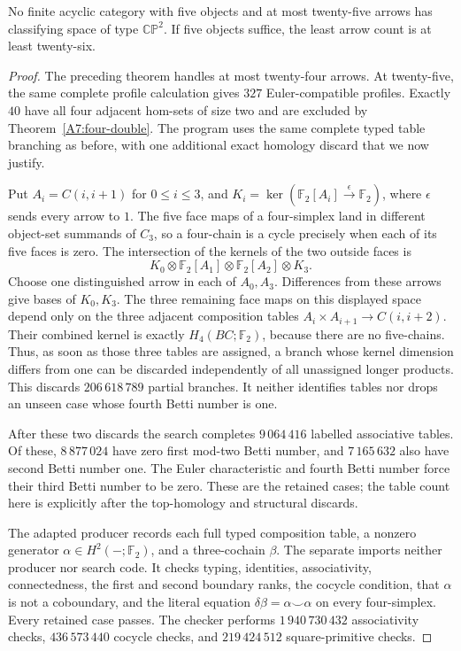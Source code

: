 \begin{theorem}\label{A7:through25}
No finite acyclic category with five objects and at most twenty-five
arrows has classifying space of type $\mathbb{CP}^2$. If five objects
suffice, the least arrow count is at least twenty-six.
\end{theorem}
\begin{proof}
The preceding theorem handles at most twenty-four arrows. At
twenty-five, the same complete profile calculation gives $327$
Euler-compatible profiles. Exactly $40$ have all four adjacent
hom-sets of size two and are excluded by
Theorem~\ref{A7:four-double}. The program
 uses the same complete typed
table branching as before, with one additional exact homology
discard that we now justify.

Put $A_i=C(i,i+1)$ for $0\le i\le3$, and
$K_i=\ker(\mathbb F_2[A_i]\xrightarrow{\epsilon}\mathbb F_2)$,
where $\epsilon$ sends every arrow to $1$. The five face maps of
a four-simplex land in different object-set summands of $C_3$,
so a four-chain is a cycle precisely when each of its five faces
is zero. The intersection of the kernels of the two outside faces
is
\[
 K_0\otimes\mathbb F_2[A_1]\otimes
       \mathbb F_2[A_2]\otimes K_3.
\]
Choose one distinguished arrow in each of $A_0,A_3$. Differences
from these arrows give bases of $K_0,K_3$. The three remaining
face maps on this displayed space depend only on the three
adjacent composition tables
$A_i\times A_{i+1}\to C(i,i+2)$.
Their combined kernel is exactly $H_4(BC;\mathbb F_2)$, because
there are no five-chains. Thus, as soon as those three tables
are assigned, a branch whose kernel dimension differs from one
can be discarded independently of all unassigned longer products.
This discards $206\,618\,789$ partial branches. It neither
identifies tables nor drops an unseen case whose fourth Betti
number is one.

After these two discards the search completes $9\,064\,416$
labelled associative tables. Of these, $8\,877\,024$ have zero
first mod-two Betti number, and $7\,165\,632$ also have second
Betti number one. The Euler characteristic and fourth Betti
number force their third Betti number to be zero. These are the
retained cases; the table count here is explicitly after the
top-homology and structural discards.

The adapted producer 
records each full typed composition table, a nonzero generator
$\alpha\in H^2(-;\mathbb F_2)$, and a three-cochain $\beta$.
The separate  imports
neither producer nor search code. It checks typing, identities,
associativity, connectedness, the first and second boundary ranks,
the cocycle condition, that $\alpha$ is not a coboundary, and
the literal equation $\delta\beta=\alpha\smile\alpha$ on every
four-simplex. Every retained case passes. The checker performs
$1\,940\,730\,432$ associativity checks,
$436\,573\,440$ cocycle checks, and $219\,424\,512$
square-primitive checks.


\end{proof}

